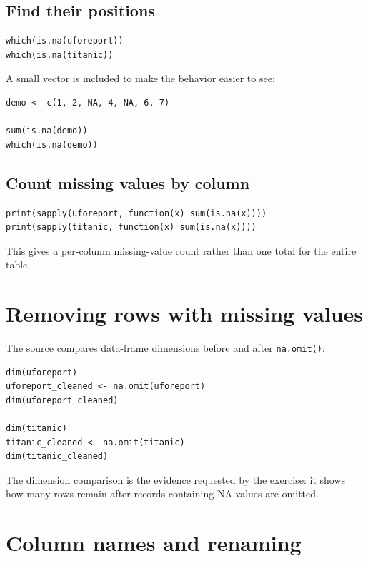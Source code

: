 \subsection{Find their positions}

\begin{lstlisting}[style=dsr]
which(is.na(uforeport))
which(is.na(titanic))
\end{lstlisting}

A small vector is included to make the behavior easier to see:

\begin{lstlisting}[style=dsr]
demo <- c(1, 2, NA, 4, NA, 6, 7)

sum(is.na(demo))
which(is.na(demo))
\end{lstlisting}

\subsection{Count missing values by column}

\begin{lstlisting}[style=dsr]
print(sapply(uforeport, function(x) sum(is.na(x))))
print(sapply(titanic, function(x) sum(is.na(x))))
\end{lstlisting}

This gives a per-column missing-value count rather than one total for the entire table.

\section{Removing rows with missing values}

The source compares data-frame dimensions before and after \texttt{na.omit()}:

\begin{lstlisting}[style=dsr]
dim(uforeport)
uforeport_cleaned <- na.omit(uforeport)
dim(uforeport_cleaned)

dim(titanic)
titanic_cleaned <- na.omit(titanic)
dim(titanic_cleaned)
\end{lstlisting}

The dimension comparison is the evidence requested by the exercise: it shows how many rows remain after records containing NA values are omitted.

\section{Column names and renaming}

